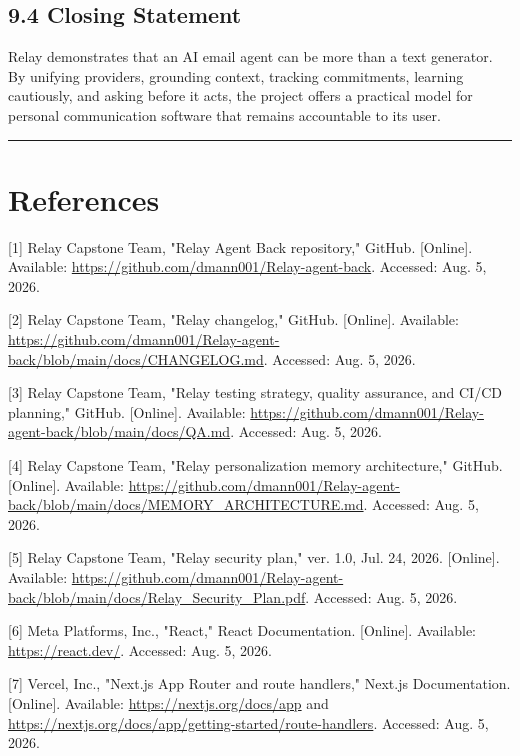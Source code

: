 \documentclass[
]{report}
\begin{document}
\section{9.4 Closing Statement}\label{94-closing-statement}

Relay demonstrates that an AI email agent can be more than a text
generator. By unifying providers, grounding context, tracking
commitments, learning cautiously, and asking before it acts, the project
offers a practical model for personal communication software that
remains accountable to its user.

\begin{center}\rule{0.5\linewidth}{0.5pt}\end{center}

\chapter{References}\label{references}

{[}1{]} Relay Capstone Team, "Relay Agent Back repository," GitHub.
{[}Online{]}. Available:
\url{https://github.com/dmann001/Relay-agent-back}. Accessed: Aug. 5,
2026.

{[}2{]} Relay Capstone Team, "Relay changelog," GitHub. {[}Online{]}.
Available:
\url{https://github.com/dmann001/Relay-agent-back/blob/main/docs/CHANGELOG.md}.
Accessed: Aug. 5, 2026.

{[}3{]} Relay Capstone Team, "Relay testing strategy, quality assurance,
and CI/CD planning," GitHub. {[}Online{]}. Available:
\url{https://github.com/dmann001/Relay-agent-back/blob/main/docs/QA.md}.
Accessed: Aug. 5, 2026.

{[}4{]} Relay Capstone Team, "Relay personalization memory
architecture," GitHub. {[}Online{]}. Available:
\url{https://github.com/dmann001/Relay-agent-back/blob/main/docs/MEMORY_ARCHITECTURE.md}.
Accessed: Aug. 5, 2026.

{[}5{]} Relay Capstone Team, "Relay security plan," ver. 1.0, Jul. 24,
2026. {[}Online{]}. Available:
\url{https://github.com/dmann001/Relay-agent-back/blob/main/docs/Relay_Security_Plan.pdf}.
Accessed: Aug. 5, 2026.

{[}6{]} Meta Platforms, Inc., "React," React Documentation.
{[}Online{]}. Available: \url{https://react.dev/}. Accessed: Aug. 5,
2026.

{[}7{]} Vercel, Inc., "Next.js App Router and route handlers," Next.js
Documentation. {[}Online{]}. Available:
\url{https://nextjs.org/docs/app} and
\url{https://nextjs.org/docs/app/getting-started/route-handlers}.
Accessed: Aug. 5, 2026.
\end{document}
